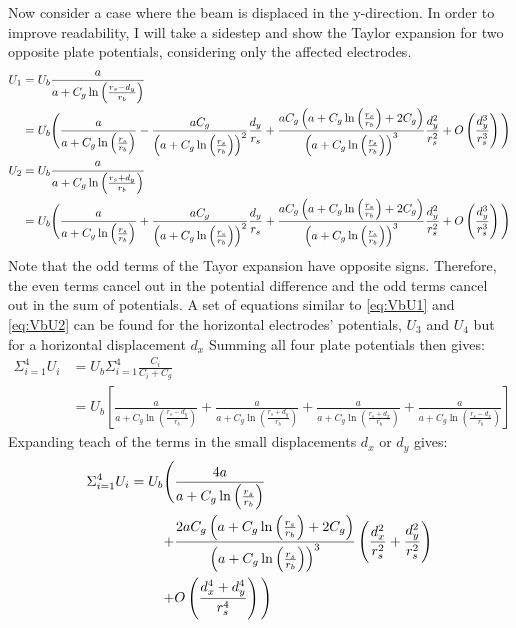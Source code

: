 Now consider a case where the beam is displaced in the y-direction. In order to improve readability, I will take a sidestep and show the Taylor expansion for two opposite plate potentials, considering only the affected electrodes.
\begin{align}
U_1 &= U_b \frac{a}{a+C_g\ln\left(\frac{r_s-d_y}{r_b}\right)} \nonumber \\
&= U_b \Bigg{(} \frac{a}{a+C_g\ln\left(\frac{r_s}{r_b}\right)} %
- \frac{aC_g}{\left( a+C_g \ln\left(\frac{r_s}{r_b}\right)  \right)^2}\frac{d_y}{r_s} %
+ \frac{a C_g \left( a + C_g \ln\left( \frac{r_s}{r_b} \right) + 2C_g\right)}{ \left( a+C_g\ln\left(\frac{r_s}{r_b}\right) \right)^3}\frac{d_y^2}{r_s^2} %
+O\left(\frac{d_y^3}{r_s^3}\right) \Bigg{)} \label{eq:VbU1}\\
U_2 &= U_b \frac{a}{a+C_g\ln\left(\frac{r_s+d_y}{r_b}\right)} \nonumber \\
&= U_b \Bigg{(} \frac{a}{a+C_g\ln\left(\frac{r_s}{r_b}\right)} %
+ \frac{aC_g}{\left( a+C_g \ln\left(\frac{r_s}{r_b}\right)  \right)^2}\frac{d_y}{r_s} %
+ \frac{a C_g \left( a + C_g \ln\left( \frac{r_s}{r_b} \right) + 2C_g\right)}{ \left( a+C_g\ln\left(\frac{r_s}{r_b}\right) \right)^3}\frac{d_y^2}{r_s^2} %
+O\left(\frac{d_y^3}{r_s^3}\right) \Bigg{)} \label{eq:VbU2}
\end{align}
Note that the odd terms of the Tayor expansion have opposite signs. Therefore, the even terms cancel out in the potential difference and the odd terms cancel out in the sum of potentials. A set of equations similar to \ref{eq:VbU1} and \ref{eq:VbU2} can be found for the horizontal electrodes' potentials, $U_3$ and $U_4$ but for a horizontal displacement $d_x$
Summing all four plate potentials then gives:
\begin{align*}
\Sigma_{i=1}^4 U_i &= U_b \Sigma_{i=1}^4 \frac{C_i}{C_i+C_g} \nonumber\\
&= U_b \left[ \frac{a}{a+C_g\ln\left(\frac{r_s-d_y}{r_b} \right)} + \frac{a}{a+C_g\ln\left(\frac{r_s+d_y}{r_b} \right)} + \frac{a}{a+C_g\ln\left(\frac{r_s+d_x}{r_b} \right)} + \frac{a}{a+C_g\ln\left(\frac{r_s-d_x}{r_b} \right)} \right]
\end{align*}
Expanding teach of the terms in the small displacements $d_x$ or $d_y$ gives:
\begin{align}
\Sigma_{i=1}^4 U_i = U_b \Bigg{(}
  &\frac{4a}{a+C_g\ln\left(\frac{r_s}{r_b} \right)} \nonumber \\
+ &\frac{2aC_g\left(a+C_g\ln\left(\frac{r_s}{r_b} \right) +2C_g \right)}{\left(a+C_g\ln\left(\frac{r_s}{r_b} \right)\right)^3} \left(\frac{d_x^2}{r_s^2} + \frac{d_y^2}{r_s^2} \right) \nonumber \\
+ &O\left(\frac{d_x^4+d_y^4}{r_s^4} \right) \Bigg{)}
\label{eq:Vbtotal}
\end{align}

